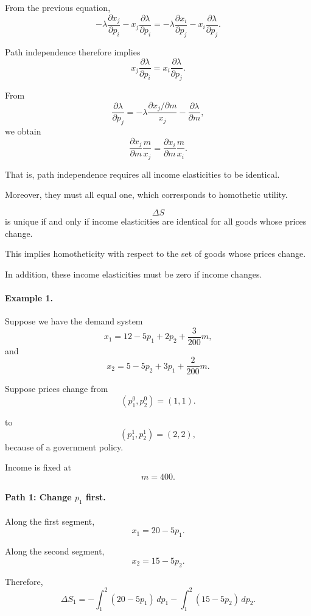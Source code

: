 From the previous equation,
\[
-\lambda\frac{\partial x_j}{\partial p_i}
-
x_j\frac{\partial \lambda}{\partial p_i}
=
-\lambda\frac{\partial x_i}{\partial p_j}
-
x_i\frac{\partial \lambda}{\partial p_j}.
\]

Path independence therefore implies
\[
x_j\frac{\partial \lambda}{\partial p_i}
=
x_i\frac{\partial \lambda}{\partial p_j}.
\]

From
\[
\frac{\partial \lambda}{\partial p_j}
=
-\lambda\frac{\partial x_j/\partial m}{x_j}
-
\frac{\partial \lambda}{\partial m},
\]
we obtain
\[
\frac{\partial x_j}{\partial m}\frac{m}{x_j}
=
\frac{\partial x_i}{\partial m}\frac{m}{x_i}.
\]

That is, path independence requires all income elasticities to be identical.

Moreover, they must all equal one, which corresponds to homothetic utility.

\begin{theorem}
\[
\Delta S
\]
is unique if and only if income elasticities are identical for all goods whose prices change.

This implies homotheticity with respect to the set of goods whose prices change.

In addition, these income elasticities must be zero if income changes.
\end{theorem}

\paragraph{Example 1.}

Suppose we have the demand system
\[
x_1
=
12-5p_1+2p_2+\frac{3}{200}m,
\]
and
\[
x_2
=
5-5p_2+3p_1+\frac{2}{200}m.
\]

Suppose prices change from
\[
(p_1^0,p_2^0)=(1,1).
\]




to
\[
(p_1^1,p_2^1)=(2,2),
\]
because of a government policy.

Income is fixed at
\[
m=400.
\]

\paragraph{Path 1: Change \(p_1\) first.}

Along the first segment,
\[
x_1=20-5p_1.
\]

Along the second segment,
\[
x_2=15-5p_2.
\]

Therefore,
\[
\Delta S_1
=
-\int_1^2 (20-5p_1)\,dp_1
-
\int_1^2 (15-5p_2)\,dp_2.
\]

